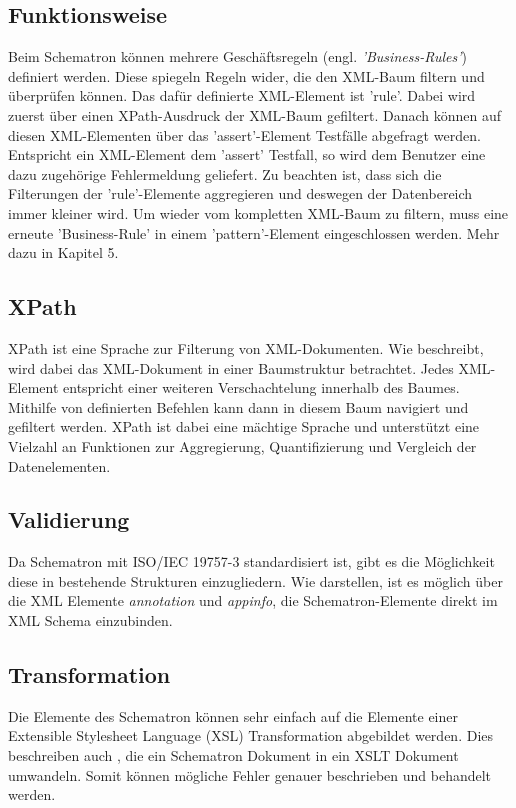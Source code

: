 \subsection{Funktionsweise}
Beim Schematron können mehrere Geschäftsregeln (engl. \emph{'Business-Rules'}) definiert werden. Diese spiegeln Regeln wider, die den XML-Baum filtern und überprüfen können. Das dafür definierte XML-Element ist 'rule'. Dabei wird zuerst über einen XPath-Ausdruck der XML-Baum gefiltert. Danach können auf diesen XML-Elementen über das 'assert'-Element Testfälle abgefragt werden. Entspricht ein XML-Element dem 'assert' Testfall, so wird dem Benutzer eine dazu zugehörige Fehlermeldung geliefert.
Zu beachten ist, dass sich die Filterungen der 'rule'-Elemente aggregieren und deswegen der Datenbereich immer kleiner wird.
Um wieder vom kompletten XML-Baum zu filtern, muss eine erneute 'Business-Rule' in einem 'pattern'-Element eingeschlossen werden. Mehr dazu in \textcite{Montero2011} Kapitel 5.


\subsection{XPath}
\label{sec:XPath}
XPath ist eine Sprache zur Filterung von XML-Dokumenten. Wie \textcite{Kay2011} beschreibt, wird dabei das XML-Dokument in einer Baumstruktur betrachtet. Jedes XML-Element entspricht einer weiteren Verschachtelung innerhalb des Baumes. Mithilfe von definierten Befehlen kann dann in diesem Baum navigiert und gefiltert werden. XPath ist dabei eine mächtige Sprache und unterstützt eine Vielzahl an Funktionen zur Aggregierung, Quantifizierung und Vergleich der Datenelementen. 

\subsection{Validierung}
Da Schematron mit ISO/IEC 19757-3 standardisiert ist, gibt es die Möglichkeit diese in bestehende Strukturen einzugliedern. Wie \textcite{Akhilesh_validatinga} darstellen, ist es möglich über die XML Elemente \emph{annotation} und \emph{appinfo}, die Schematron-Elemente direkt im XML Schema einzubinden.

\subsection{Transformation}
Die Elemente des Schematron können sehr einfach auf die Elemente einer Extensible Stylesheet Language (XSL) Transformation abgebildet werden.
Dies beschreiben auch \textcite{Tao2013}, die ein Schematron Dokument in ein XSLT Dokument umwandeln. Somit können mögliche Fehler genauer beschrieben und behandelt werden.

